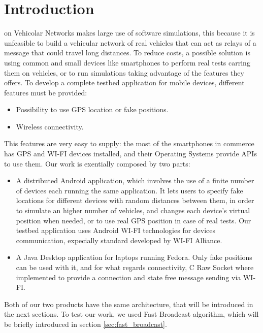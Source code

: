 \section{Introduction}
% 
% 
% 
% 
 on Vehicolar Networks makes large use of software simulations, this because it is unfeasible to build a vehicular network of real vehicles that can act as relays of a message that could travel long distances.
To reduce costs, a possible solution is using common and small devices like smartphones to perform real tests carring them on vehicles, or to run simulations taking advantage of the features they offers.
To develop a complete testbed application for mobile devices, different features must be provided:
\begin{itemize}
	\item Possibility to use GPS location or fake positions.
	\item Wireless connectivity.
\end{itemize}
This features are very easy to supply: the most of the smartphones in commerce has GPS and WI-FI devices installed, and their Operating Systems provide APIs to use them.
Our work is exentially composed by two parts:
\begin{itemize}
	\item A distributed Android application, which involves the use of a finite number of devices each running the same application. It lets users to specify fake locations for different devices with random distances between them, in order to simulate an higher number of vehicles, and changes each device's virtual position when needed, or to use real GPS position in case of real tests. Our testbed application uses Android WI-FI technologies for devices communication, expecially \direct standard developed by WI-FI Alliance\textsuperscript{\texttrademark}.
	\item A Java Desktop application for laptops running Fedora. Only fake positions can be used with it, and for what regards connectivity, C Raw Socket where implemented to provide a connection and state free message sending via WI-FI. 
\end{itemize}
Both of our two products have the same architecture, that will be introduced in the next sections. To test our work, we used Fast Broadcast algorithm, which will be briefly introduced in section \ref{sec:fast_broadcast}.

